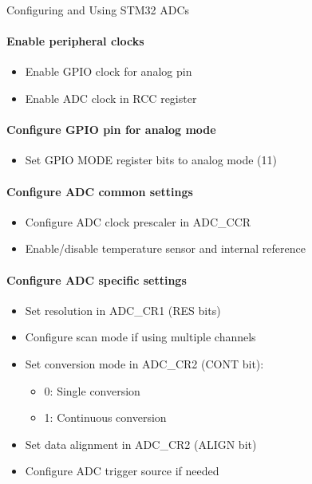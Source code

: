 \begin{KR}{Configuring and Using STM32 ADCs}
\paragraph{Enable peripheral clocks}
\begin{itemize}
    \item Enable GPIO clock for analog pin
    \item Enable ADC clock in RCC register
\end{itemize}

\paragraph{Configure GPIO pin for analog mode}
\begin{itemize}
    \item Set GPIO MODE register bits to analog mode (11)
\end{itemize}

\paragraph{Configure ADC common settings}
\begin{itemize}
    \item Configure ADC clock prescaler in ADC\_CCR
    \item Enable/disable temperature sensor and internal reference
\end{itemize}

\paragraph{Configure ADC specific settings}
\begin{itemize}
    \item Set resolution in ADC\_CR1 (RES bits)
    \item Configure scan mode if using multiple channels
    \item Set conversion mode in ADC\_CR2 (CONT bit):
    \begin{itemize}
        \item 0: Single conversion
        \item 1: Continuous conversion
    \end{itemize}
    \item Set data alignment in ADC\_CR2 (ALIGN bit)
    \item Configure ADC trigger source if needed
\end{itemize}


\end{KR}
